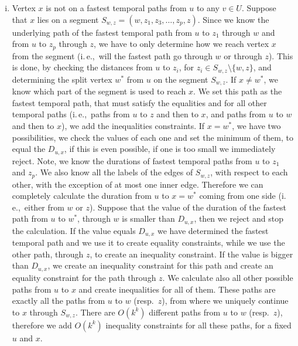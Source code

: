 \documentclass[11pt,a4paper]{article}
\theoremstyle{remark}
\theoremstyle{definition}
\newcommand{\ie}{i.\,e.,\ }
\begin{document}
\begin{enumerate}[(i)]
    \item \label{item:FPT-uToxcase2}
    Vertex $x$ is not on a fastest temporal paths from $u$ to any $v \in U$.
    Suppose that $x$ lies on a segment $S_{w,z} = (w,z_1,z_3, \dots, z_p, z)$.
    Since we know the underlying path of the fastest temporal path from $u$ to $z_1$ through $w$ and from $u$ to $z_p$ through $z$,
    we have to only determine how we reach vertex $x$ from the segment (\ie will the fastest path go through $w$ or through $z$).
    This is done,
    by checking the distances from $u$ to $z_i$, for $z_i \in S_{w,z} \setminus \{w,z\}$,
    and determining the split vertex $w^*$ from $u$ on the segment $S_{w,z}$.
    If $x \neq w^*$, we know which part of the segment is used to reach $x$.
    We set this path as the fastest temporal path, that must satisfy the equalities and for all other temporal paths
    (\ie paths from $u$ to $z$ and then to $x$, and paths from $u$ to $w$ and then to $x$),
    we add the inequalities constraints.
    If $x = w^*$, we have two possibilities, we check the values of each one and set the minimum of them, to equal the $D_{u,x}$, 
    if this is even possible, if one is too small we immediately reject.
    Note, we know the durations of fastest temporal paths from $u$ to $z_1$ and $z_p$. We also know all the labels of the edges of $S_{w,z}$, with respect to each other,
    with the exception of at most one inner edge.
    Therefore we can completely calculate the duration from $u$ to $x=w^*$ coming from one side (\ie either from $w$ or $z$).
    Suppose that the value of the duration of the fastest path from $u$ to $w^*$, through $w$ is
    smaller than $D_{u,x}$, then we reject and stop the calculation.
    If the value equals $D_{u,x}$ we have determined the fastest temporal path and we use it to create equality constraints, while we use the other path, through $z$, to create an inequality constraint.
    If the value is bigger than $D_{u,x}$, we create an inequality constraint for this path and create an equality constraint for the path through $z$.
    We calculate also all other possible paths from $u$ to $x$ and create inequalities for all of them.
    These paths are exactly all the paths from $u$ to $w$ (resp.~$z$), from where we uniquely continue to $x$ through $S_{w,z}$.
    There are $O(k^{k})$ different paths from $u$ to $w$ (resp.~$z$), therefore we add
    $O(k^k)$ inequality constraints for all these paths, for a fixed $u$ and $x$.   
\end{enumerate} 
\end{document}

